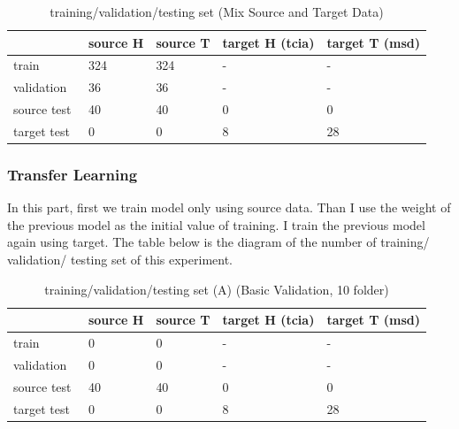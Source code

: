 \begin{table}[H]
\centering
\caption{training/validation/testing set (Mix Source and Target Data)}
\begin{tabular}{|l|l|l|l|l|} 
\hline
~            & source H & source T & target H (tcia) & target T (msd)  \\ 
\hline
train        & 324      & 324      & -               & -               \\ 
\hline
validation   & 36       & 36       & -               & -               \\ 
\hline
source test  & 40       & 40       & 0               & 0               \\ 
\hline
target test~ & 0        & 0        & 8               & 28              \\
\hline
\end{tabular}
\end{table}

\subsubsection{Transfer Learning}
In this part, first we train model only using source data. Than I use the weight of the previous model as the initial value of training. I train the previous model again using target. The table below is the diagram of the number of training/ validation/ testing set of this experiment. 

\begin{table}[H]
\centering
\caption{training/validation/testing set (A) (Basic Validation, 10 folder)}
\begin{tabular}{|l|l|l|l|l|} 
\hline
~            & source H & source T & target H (tcia) & target T (msd)  \\ 
\hline
train        & 0      & 0      & -               & -               \\ 
\hline
validation   & 0       & 0       & -               & -               \\ 
\hline
source test  & 40       & 40       & 0               & 0               \\ 
\hline
target test~ & 0        & 0        & 8               & 28              \\
\hline
\end{tabular}
\end{table}

